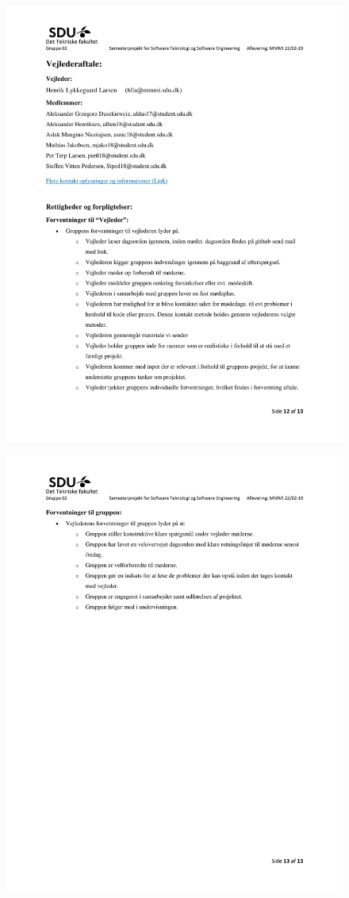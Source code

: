 \begin{figure}[hb]
  \includegraphics[scale = 0.33]{./PNG/Projektforslag/Projektforslag-12.jpg} 
\end{figure}

\begin{figure}[hb]
  \includegraphics[scale = 0.33]{./PNG/Projektforslag/Projektforslag-13.jpg} 
\end{figure}
